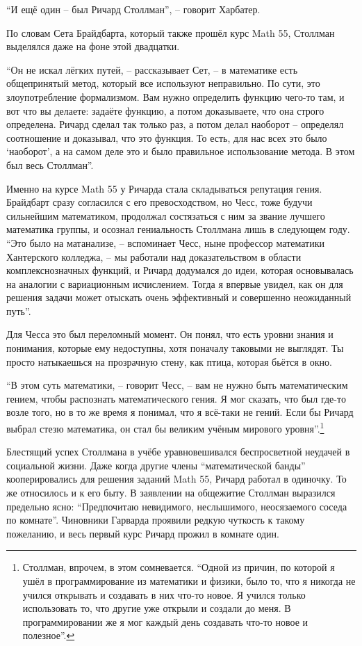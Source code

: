 \enquote{И ещё один -- был Ричард Столлман}, -- говорит Харбатер.

По словам Сета Брайдбарта, который также прошёл курс Math 55, Столлман выделялся даже на фоне этой двадцатки.

\enquote{Он не искал лёгких путей, -- рассказывает Сет, -- в математике есть общепринятый метод, который все используют неправильно. По сути, это злоупотребление формализмом. Вам нужно определить функцию чего-то там, и вот что вы делаете: задаёте функцию, а потом доказываете, что она строго определена. Ричард сделал так только раз, а потом делал наоборот -- определял соотношение и доказывал, что это функция. То есть, для нас всех это было \enquote{наоборот}, а на самом деле это и было правильное использование метода. В этом был весь Столлман}.

Именно на курсе Math 55 у Ричарда стала складываться репутация гения. Брайдбарт сразу согласился с его превосходством, но Чесс, тоже будучи сильнейшим математиком, продолжал состязаться с ним за звание лучшего математика группы, и осознал гениальность Столлмана лишь в следующем году. \enquote{Это было на матанализе, -- вспоминает Чесс, ныне профессор математики Хантерского колледжа, -- мы работали над доказательством в области комплекснозначных функций, и Ричард додумался до идеи, которая основывалась на аналогии с вариационным исчислением. Тогда я впервые увидел, как он для решения задачи может отыскать очень эффективный и совершенно неожиданный путь}.

Для Чесса это был переломный момент. Он понял, что есть уровни знания и понимания, которые ему недоступны, хотя поначалу таковыми не выглядят. Ты просто натыкаешься на прозрачную стену, как птица, которая бьётся в окно.

\enquote{В этом суть математики, -- говорит Чесс, -- вам не нужно быть математическим гением, чтобы распознать математического гения. Я мог сказать, что был где-то возле того, но в то же время я понимал, что я всё-таки не гений. Если бы Ричард выбрал стезю математика, он стал бы великим учёным мирового уровня}.\footnote{Столлман, впрочем, в этом сомневается. \enquote{Одной из причин, по которой я ушёл в программирование из математики и физики, было то, что я никогда не учился открывать и создавать в них что-то новое. Я учился только использовать то, что другие уже открыли и создали до меня. В программировании же я мог каждый день создавать что-то новое и полезное}.}

Блестящий успех Столлмана в учёбе уравновешивался беспросветной неудачей в социальной жизни. Даже когда другие члены \enquote{математической банды} кооперировались для решения заданий Math 55, Ричард работал в одиночку. То же относилось и к его быту. В заявлении на общежитие Столлман выразился предельно ясно: \enquote{Предпочитаю невидимого, неслышимого, неосязаемого соседа по комнате}. Чиновники Гарварда проявили редкую чуткость к такому пожеланию, и весь первый курс Ричард прожил в комнате один.

